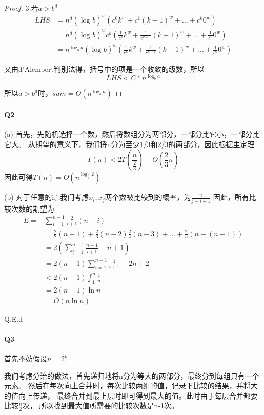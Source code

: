 \documentclass[UTF8]{ctexart}
\renewcommand{\(}{\left(}
\renewcommand{\)}{\right)}
\begin{document}
\begin{proof}
3.若$a>b^{d}$
$$
\begin{aligned}
LHS&=n^{d}\(\log_{}{b}\)^{w}\(c^{0}k^{w}+c^{1}\(k-1\)^{w}+...+c^{k}0^{w}\)\\
&=n^{d}\(\log_{}{b}\)^{w}c^{k}\(\frac{1}{c^{k}}k^{w}+\frac{1}{c^{k-1}}\(k-1\)^{w}+...+\frac{1}{c^{0}}0^{w}\)\\
&=n^{\log_{b}{a}}\(\log_{}{b}\)^{w}\(\frac{1}{c^{k}}k^{w}+\frac{1}{c^{k-1}}\(k-1\)^{w}+...+\frac{1}{c^{0}}0^{w}\)
\end{aligned}
$$

又由d'Alembert判别法得，括号中的项是一个收敛的级数，所以
$$LHS<C*n^{\log_{b}{a}}$$

所以$a>b^{d}$时，$sum=O\(n^{\log_{b}{a}}\)$

\end{proof}
\paragraph{Q2} 

(a) 首先，先随机选择一个数，然后将数组分为两部分，一部分比它小，一部分比它大。
从期望的意义下，我们将n分为至少1/3和2/3的两部分，因此根据主定理
$$T\(n\)<2T\(\frac{n}{\frac{2}{3}}\)+O\(\frac{2}{3}n\)$$
因此可得$T\(n\)=O\(n^{\log_{\frac{3}{2}}{2}}\)$


(b) 对于任意的i,j,我们考虑$x_i,x_j$两个数被比较到的概率，为$\frac{2}{j-i+1}$
因此，所有比较次数的期望为
$$
\begin{aligned}
    E=&\sum_{i=1}^{n-1}\frac{2}{i+1}\(n-i\)\\
&=\frac{2}{2}\(n-1\)+\frac{2}{3}\(n-2\)\frac{2}{4}\(n-3\)+...+\frac{2}{n}\(n-\(n-1\)\)\\
&=2\(\sum_{i=1}^{n-1}{\frac{n+1}{i+1}-n+1}\)\\
&=2\(n+1\)\sum_{i=1}^{n-1}{\frac{1}{i+1}}-2n+2\\
&<2\(n+1\)\int_{1}^{n}\frac{1}{n}\\
&=2\(n+1\)\ln{n}\\
&=O\(n\ln{n}\)
\end{aligned}$$

Q.E.d


\paragraph{Q3}
首先不妨假设$n=2^k$

我们考虑分治的做法，首先递归地将n分为等大的两部分，最终分到每组只有一个元素。
然后在每次向上合并时，每次比较两组的值，记录下比较的结果，并将大的值向上传递，
最终合并到最上层时即可得到最大的值。此时由于每层合并都要比较$\frac{n}{2}$次，
所以找到最大值所需要的比较次数是n-1次。
\end{document}
